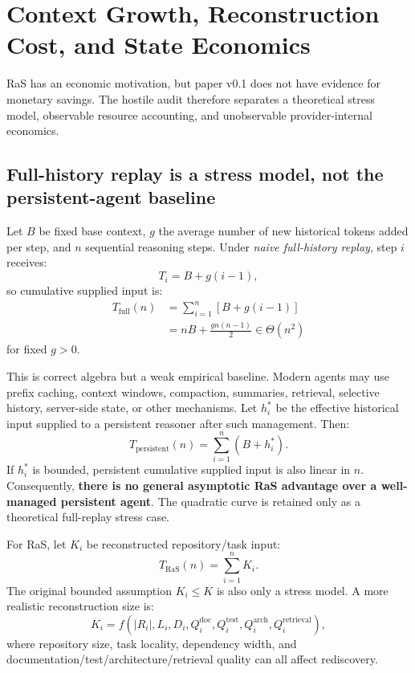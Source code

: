 \section{Context Growth, Reconstruction Cost, and State Economics}
\label{sec:cost}

RaS has an economic motivation, but paper v0.1 does not have evidence for monetary savings. The hostile audit therefore separates a theoretical stress model, observable resource accounting, and unobservable provider-internal economics.

\subsection{Full-history replay is a stress model, not the persistent-agent baseline}

Let $B$ be fixed base context, $g$ the average number of new historical tokens added per step, and $n$ sequential reasoning steps. Under \emph{naive full-history replay}, step $i$ receives:
\begin{equation}
T_i=B+g(i-1),
\end{equation}
so cumulative supplied input is:
\begin{align}
T_{\mathrm{full}}(n)
&=\sum_{i=1}^{n}[B+g(i-1)] \\
&=nB+\frac{gn(n-1)}{2}
\in\Theta(n^2)
\end{align}
for fixed $g>0$.

This is correct algebra but a weak empirical baseline. Modern agents may use prefix caching, context windows, compaction, summaries, retrieval, selective history, server-side state, or other mechanisms. Let $h_i^*$ be the effective historical input supplied to a persistent reasoner after such management. Then:
\begin{equation}
T_{\mathrm{persistent}}(n)=\sum_{i=1}^{n}(B+h_i^*).
\label{eq:persistent-general}
\end{equation}
If $h_i^*$ is bounded, persistent cumulative supplied input is also linear in $n$. Consequently, \textbf{there is no general asymptotic RaS advantage over a well-managed persistent agent}. The quadratic curve is retained only as a theoretical full-replay stress case.

For RaS, let $K_i$ be reconstructed repository/task input:
\begin{equation}
T_{\mathrm{RaS}}(n)=\sum_{i=1}^{n}K_i.
\end{equation}
The original bounded assumption $K_i\le K$ is also only a stress model. A more realistic reconstruction size is:
\begin{equation}
K_i=f(|R_i|,L_i,D_i,Q_i^{\mathrm{doc}},Q_i^{\mathrm{test}},Q_i^{\mathrm{arch}},Q_i^{\mathrm{retrieval}}),
\label{eq:realistic-k}
\end{equation}
where repository size, task locality, dependency width, and documentation/test/architecture/retrieval quality can all affect rediscovery.


